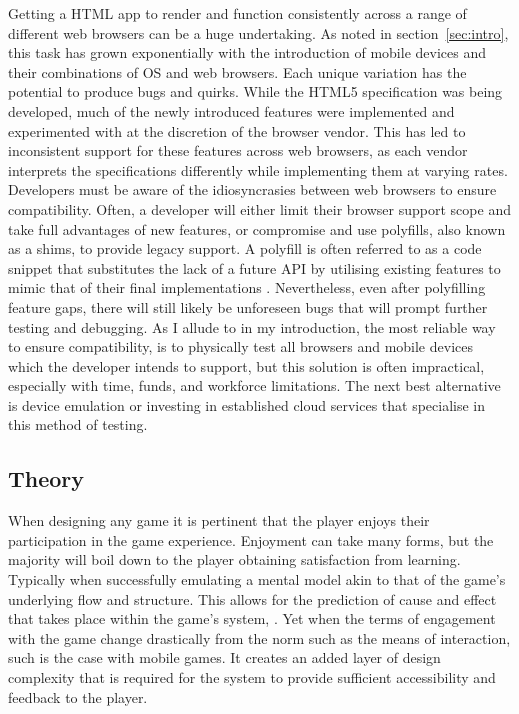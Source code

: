 \documentclass[final]{cmpreport}
\begin{document}
Getting a HTML app to render and function consistently across a range of different web browsers can be a huge undertaking. As noted in section~\ref{sec:intro}, this task has grown exponentially with the introduction of mobile devices and their combinations of OS and web browsers. Each unique variation has the potential to produce bugs and quirks. While the HTML5 specification was being developed, much of the newly introduced features were implemented and experimented with at the discretion of the browser vendor. This has led to inconsistent support for these features across web browsers, as each vendor interprets the specifications differently while implementing them at varying rates. Developers must be aware of the idiosyncrasies between web browsers to ensure compatibility. Often, a developer will either limit their browser support scope and take full advantages of new features, or compromise and use polyfills, also known as a shims, to provide legacy support. A polyfill is often referred to as a code snippet that substitutes the lack of a future API by utilising existing features to mimic that of their final implementations \cite{Lawson}. Nevertheless, even after polyfilling feature gaps, there will still likely be unforeseen bugs that will prompt further testing and debugging. As I allude to in my introduction, the most reliable way to ensure compatibility, is to physically test all browsers and mobile devices which the developer intends to support, but this solution is often impractical, especially with time, funds, and workforce limitations. The next best alternative is device emulation or investing in established cloud services that specialise in this method of testing.

\subsection{Theory}
When designing any game it is pertinent that the player enjoys their participation in the game experience. Enjoyment can take many forms, but the majority will boil down to the player obtaining satisfaction from learning. Typically when successfully emulating a mental model akin to that of the game's underlying flow and structure. This allows for the prediction of cause and effect that takes place within the game's system, \cite{Cook}. Yet when the terms of engagement with the game change drastically from the norm such as the means of interaction, such is the case with mobile games. It creates an added layer of design complexity that is required for the system to provide sufficient accessibility and feedback to the player.
\end{document}
